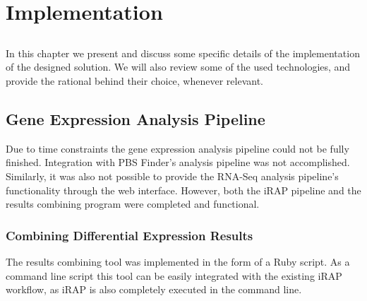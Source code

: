 \chapter{Implementation} \label{chap:implementation}

\section*{}

In this chapter we present and discuss some specific details of the
implementation of the designed solution. We will also review some of the used
technologies, and provide the rational behind their choice, whenever relevant.


\section{Gene Expression Analysis Pipeline}


Due to time constraints the gene expression analysis pipeline could not be fully
finished. Integration with PBS Finder's analysis pipeline was not accomplished.
Similarly, it was also not possible to provide the RNA-Seq analysis pipeline's
functionality through the web interface. However, both the iRAP pipeline and the
results combining program were completed and functional.

\subsection{Combining Differential Expression Results}

The results combining tool was implemented in the form of a Ruby script. As a
command line script this tool can be easily integrated with the existing iRAP
workflow, as iRAP is also completely executed in the command line.

